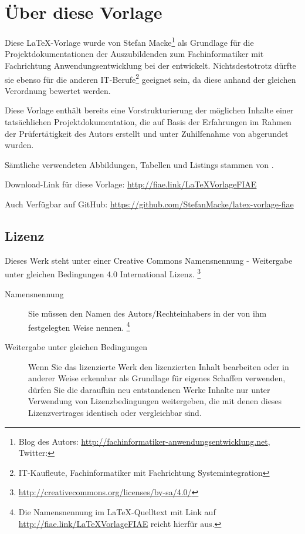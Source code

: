 \section*{Über diese Vorlage}

Diese \LaTeX-Vorlage wurde von Stefan Macke\footnote{Blog des Autors:
\url{http://fachinformatiker-anwendungsentwicklung.net}, Twitter:
} als Grundlage für die Projektdokumentationen der Auszubildenden zum Fachinformatiker mit Fachrichtung
Anwendungsentwicklung bei der \AO entwickelt. Nichtsdestotrotz dürfte sie ebenso für die anderen IT-Berufe\footnote{\zB IT-Kaufleute, Fachinformatiker
mit Fachrichtung Systemintegration \usw} geeignet sein, da diese anhand der gleichen Verordnung bewertet werden.

Diese Vorlage enthält bereits eine Vorstrukturierung der möglichen Inhalte einer tatsächlichen Projektdokumentation, die auf Basis der
Erfahrungen im Rahmen der Prüfertätigkeit des Autors erstellt und unter Zuhilfenahme von \citet{Rohrer2011} abgerundet wurden.

Sämtliche verwendeten Abbildungen, Tabellen und Listings stammen von \citet{Grashorn2010}.

Download-Link für diese Vorlage: \url{http://fiae.link/LaTeXVorlageFIAE}

Auch Verfügbar auf GitHub: \url{https://github.com/StefanMacke/latex-vorlage-fiae}

\subsection*{Lizenz}

\begin{center}
\end{center}
Dieses Werk steht unter einer Creative Commons Namensnennung - Weitergabe unter gleichen Bedingungen 4.0 International Lizenz.
\footnote{\url{http://creativecommons.org/licenses/by-sa/4.0/}}

\begin{center}
\end{center}

\begin{description}
	\item[Namensnennung] Sie müssen den Namen des Autors/Rechteinhabers in der von ihm festgelegten Weise nennen.
	\footnote{Die Namensnennung im \LaTeX-Quelltext mit Link auf \url{http://fiae.link/LaTeXVorlageFIAE} reicht hierfür aus.}
	\item[Weitergabe unter gleichen Bedingungen] Wenn Sie das lizenzierte Werk \bzw den lizenzierten Inhalt bearbeiten
	oder in anderer Weise erkennbar als Grundlage für eigenes Schaffen verwenden, dürfen Sie die daraufhin neu entstandenen
	Werke \bzw Inhalte nur unter Verwendung von Lizenzbedingungen weitergeben, die mit denen dieses Lizenzvertrages identisch oder vergleichbar sind.
\end{description}

